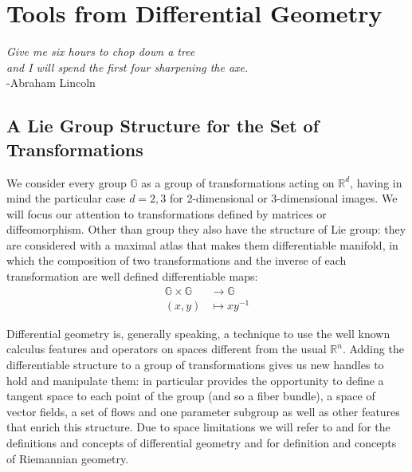 \chapter{Tools from Differential Geometry}\label{ch:tools}

\begin{flushright}
\emph{Give me six hours to chop down a tree\\ and I will spend the first four sharpening the axe.}
\\ -Abraham Lincoln
\end{flushright}

\vspace{0.6cm}

\section{A Lie Group Structure for the Set of Transformations}\label{se:finite_lie_group}

We consider every group $\mathbb{G}$ as a group of transformations acting on $\mathbb{R}^{d}$, having in mind the particular case $d=2,3$ for 2-dimensional or 3-dimensional images.
We will focus our attention to transformations defined by matrices or diffeomorphism. Other than group they also have the structure of Lie group: they are considered with a maximal atlas that makes them differentiable manifold, in which the composition of two transformations and the inverse of each transformation are well defined differentiable maps:
\begin{align*}
\mathbb{G} \times \mathbb{G} & \longrightarrow  \mathbb{G}    \\
(x,y) &\longmapsto  x y^{-1}
\end{align*}

Differential geometry is, generally speaking, a technique to use the well known calculus features and operators on spaces different from the usual $\mathbb{R}^{n}$. Adding the differentiable structure to a group of transformations gives us new handles to hold and manipulate them: in particular provides the opportunity to define a tangent space to each point of the group (and so a fiber bundle), a space of vector fields, a set of flows and one parameter subgroup as well as other features that enrich this structure.
Due to space limitations we will refer to \cite{do1976differential} and \cite{lee2012introduction} for the definitions and concepts of differential geometry and \cite{do1992riemannian} for definition and concepts of Riemannian geometry.


